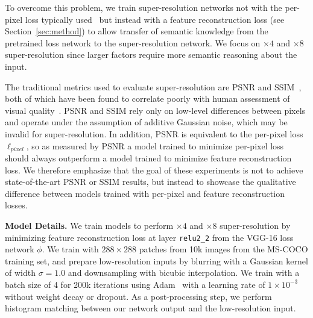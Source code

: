 \documentclass[runningheads]{llncs}
\begin{document}
% 

To overcome this problem, we train super-resolution networks not with the per-pixel
loss typically used~\cite{dong2015image} but instead with a feature reconstruction
loss (see Section~\ref{sec:method}) to allow transfer of semantic knowledge from
the pretrained loss network to the super-resolution network. We focus on $\times4$ and $\times8$
super-resolution since larger factors require more semantic reasoning about the input.

The traditional metrics used to evaluate super-resolution are PSNR and SSIM~\cite{wang2004image},
both of which have been found to correlate poorly with human assessment of visual
quality~\cite{hanhart2013benchmarking,wang2009mean,huynh2008scope,sheikh2006statistical,kundu2015full}.
PSNR and SSIM rely only on low-level differences between pixels and operate under the
assumption of additive Gaussian noise, which may be invalid for super-resolution. In addition, PSNR
is equivalent to the per-pixel loss $\ell_{pixel}$, so as measured by PSNR a model trained to minimize
per-pixel loss should always outperform a model trained to minimize feature reconstruction loss.
We therefore emphasize that the goal of these experiments is not to achieve state-of-the-art PSNR or
SSIM results, but instead to showcase the qualitative difference between models trained with per-pixel
and feature reconstruction losses.


\vspace{1mm}
\noindent \textbf{Model Details.}
We train models to perform $\times4$ and $\times8$ super-resolution by minimizing feature
reconstruction loss at layer \verb.relu2_2. from the VGG-16 loss network $\phi$. We train with
$288\times288$ patches from 10k images from the MS-COCO training set, and prepare low-resolution
inputs by blurring with a Gaussian kernel of width $\sigma=1.0$ and downsampling with bicubic
interpolation. We train with a batch size of 4 for 200k iterations using Adam~\cite{kingma2014adam}
with a learning rate of $1\times10^{-3}$ without weight decay or dropout. As a post-processing step,
we perform histogram matching between our network output and the low-resolution input.
\end{document}
